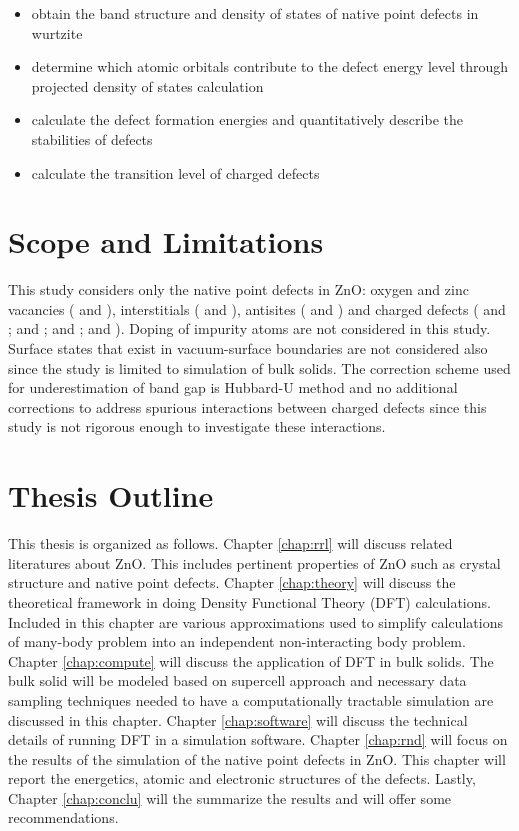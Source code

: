 \begin{itemize}
	\item obtain the band structure and density of states of native point defects in wurtzite 
	\item determine which atomic orbitals  contribute to the defect energy level through projected density of states calculation
	\item calculate the defect formation energies and quantitatively describe the stabilities of defects
	\item calculate the transition level of charged defects
\end{itemize}

\section{Scope and Limitations}
This study considers only the native point defects in ZnO: oxygen and zinc vacancies ( and ), interstitials ( and ), antisites ( and ) and charged defects ( and ;  and ;  and ;  and ). Doping of impurity atoms are not considered in this study. Surface states that exist in vacuum-surface boundaries are not considered also since the study is limited to simulation of bulk solids. The correction scheme used for underestimation of band gap is Hubbard-U method and no additional corrections to address spurious interactions between charged defects since this study is not rigorous enough to investigate these interactions.


\section{Thesis Outline}
This thesis is organized as follows. Chapter \ref{chap:rrl} will discuss related literatures about ZnO. This includes pertinent properties of ZnO such as crystal structure and native point defects. Chapter \ref{chap:theory} will discuss the theoretical framework in doing Density Functional Theory (DFT) calculations. Included in this chapter are various approximations used to simplify calculations of many-body problem into an independent non-interacting body problem. Chapter \ref{chap:compute} will discuss the application of DFT in bulk solids. The bulk solid will be modeled based on supercell approach and necessary data sampling techniques needed to have a computationally tractable simulation are discussed in this chapter. Chapter \ref{chap:software} will discuss the technical details of running DFT in a simulation software. Chapter \ref{chap:rnd} will focus on the results of the simulation of the native point defects in ZnO. This chapter will report the energetics, atomic and electronic structures of the defects. Lastly, Chapter \ref{chap:conclu} will the summarize the results and will offer some recommendations.
